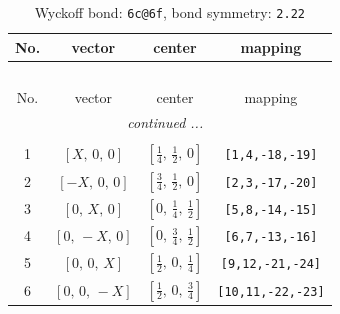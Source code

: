 \documentclass[fleqn,8pt]{jsarticle}
\begin{document}
\begin{longtable}{cccc}
\caption{Wyckoff bond: {\tt 6c@6f}, bond symmetry: {\tt 2.22}}
 \\
 \hline \hline
No. & vector & center & mapping \\ \hline \endfirsthead

\multicolumn{3}{l}{\tablename\ \thetable{}} \\
 \hline \hline
No. & vector & center & mapping \\ \hline \endhead

 \hline \hline
\multicolumn{3}{r}{\footnotesize\it continued ...} \\ \endfoot

 \hline \hline
\multicolumn{3}{r}{} \\ \endlastfoot

1 & $\left[ X,\, 0,\, 0 \right]$ & $\left[ \frac{1}{4},\, \frac{1}{2},\, 0 \right]$ & {\tt [1,4,-18,-19]} \\ \hline
2 & $\left[ - X,\, 0,\, 0 \right]$ & $\left[ \frac{3}{4},\, \frac{1}{2},\, 0 \right]$ & {\tt [2,3,-17,-20]} \\ \hline
3 & $\left[ 0,\, X,\, 0 \right]$ & $\left[ 0,\, \frac{1}{4},\, \frac{1}{2} \right]$ & {\tt [5,8,-14,-15]} \\ \hline
4 & $\left[ 0,\, - X,\, 0 \right]$ & $\left[ 0,\, \frac{3}{4},\, \frac{1}{2} \right]$ & {\tt [6,7,-13,-16]} \\ \hline
5 & $\left[ 0,\, 0,\, X \right]$ & $\left[ \frac{1}{2},\, 0,\, \frac{1}{4} \right]$ & {\tt [9,12,-21,-24]} \\ \hline
6 & $\left[ 0,\, 0,\, - X \right]$ & $\left[ \frac{1}{2},\, 0,\, \frac{3}{4} \right]$ & {\tt [10,11,-22,-23]} \\
\end{longtable}
\renewcommand{\arraystretch}{1.2}
\end{document}
